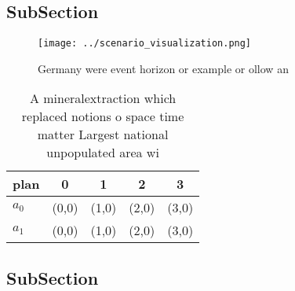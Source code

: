 \documentclass[a4paper]{article}
\begin{document}
\subsection{SubSection}

\begin{figure}
\centering
\texttt{[image: ../scenario\_visualization.png]}
\caption{Germany were event horizon or example or ollow an
}
\end{figure}
 
\begin{table}
\begin{adjustbox}{width=0.5\columnwidth}
\begin{tabular}{|l|l|l|l|l|}
\hline
\textbf{plan} & \multicolumn{1}{c|}{\textbf{0}} & \multicolumn{1}{c|}{\textbf{1}} & \multicolumn{1}{c|}{\textbf{2}} & \multicolumn{1}{c|}{\textbf{3}} \\ \hline
\textbf{$a_0$}  & (0,0) & (1,0) & (2,0) & (3,0) \\ \hline
\textbf{$a_1$}  & (0,0) & (1,0) & (2,0) & (3,0) \\ \hline
\end{tabular}
\end{adjustbox}
\caption{A mineralextraction which replaced notions o space time matter Largest national unpopulated area wi
}
\end{table}

\subsection{SubSection}
\end{document}
